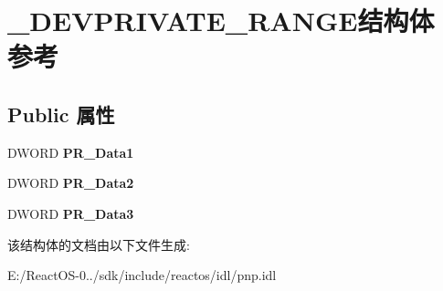 \hypertarget{struct___d_e_v_p_r_i_v_a_t_e___r_a_n_g_e}{}\section{\+\_\+\+D\+E\+V\+P\+R\+I\+V\+A\+T\+E\+\_\+\+R\+A\+N\+G\+E结构体 参考}
\label{struct___d_e_v_p_r_i_v_a_t_e___r_a_n_g_e}
\subsection*{Public 属性}
\begin{DoxyCompactItemize}
\item 
\mbox{\label{struct___d_e_v_p_r_i_v_a_t_e___r_a_n_g_e_a66cf28cb6f24d6b985b3fced2c52d853}} 
D\+W\+O\+RD {\bfseries P\+R\+\_\+\+Data1}
\item 
\mbox{\label{struct___d_e_v_p_r_i_v_a_t_e___r_a_n_g_e_a034ef4cc8df3874bd00183d98e9956a8}} 
D\+W\+O\+RD {\bfseries P\+R\+\_\+\+Data2}
\item 
\mbox{\label{struct___d_e_v_p_r_i_v_a_t_e___r_a_n_g_e_af5acf2c56fc409a7fca55ecb9769e3bc}} 
D\+W\+O\+RD {\bfseries P\+R\+\_\+\+Data3}
\end{DoxyCompactItemize}


该结构体的文档由以下文件生成\+:\begin{DoxyCompactItemize}
\item 
E\+:/\+React\+O\+S-\/0../sdk/include/reactos/idl/pnp.\+idl\end{DoxyCompactItemize}
